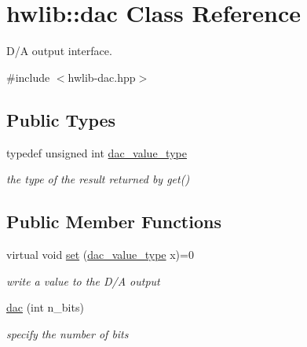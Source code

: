 \hypertarget{classhwlib_1_1dac}{}\section{hwlib\+:\+:dac Class Reference}
\label{classhwlib_1_1dac}


D/A output interface.  




{\ttfamily \#include $<$hwlib-\/dac.\+hpp$>$}

\subsection*{Public Types}
\begin{DoxyCompactItemize}
\item 
typedef unsigned int \hyperlink{classhwlib_1_1dac_a63d1c11b81be9215e94eb81981045a22}{dac\+\_\+value\+\_\+type}\hypertarget{classhwlib_1_1dac_a63d1c11b81be9215e94eb81981045a22}{}\label{classhwlib_1_1dac_a63d1c11b81be9215e94eb81981045a22}

\begin{DoxyCompactList}\small\item\em the type of the result returned by get() \end{DoxyCompactList}\end{DoxyCompactItemize}
\subsection*{Public Member Functions}
\begin{DoxyCompactItemize}
\item 
virtual void \hyperlink{classhwlib_1_1dac_aba799313f06200f44c5146643abe4e08}{set} (\hyperlink{classhwlib_1_1dac_a63d1c11b81be9215e94eb81981045a22}{dac\+\_\+value\+\_\+type} x)=0
\begin{DoxyCompactList}\small\item\em write a value to the D/A output \end{DoxyCompactList}\item 
\hyperlink{classhwlib_1_1dac_a09b329cd33da005b6a55bafafba36e62}{dac} (int n\+\_\+bits)\hypertarget{classhwlib_1_1dac_a09b329cd33da005b6a55bafafba36e62}{}\label{classhwlib_1_1dac_a09b329cd33da005b6a55bafafba36e62}

\begin{DoxyCompactList}\small\item\em specify the number of bits \end{DoxyCompactList}\end{DoxyCompactItemize}
